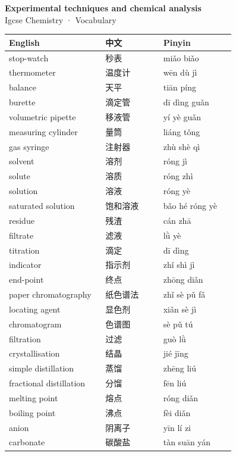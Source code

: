 \documentclass[11pt]{article}
\begin{document}
\begin{center}
  {\LARGE\bfseries Experimental techniques and chemical analysis}\\[0.35em]
  {\large Igcse Chemistry · Vocabulary}
\end{center}
\vspace{0.6em}

\begin{longtable}{@{}p{0.40\linewidth}p{0.24\linewidth}p{0.30\linewidth}@{}}
\toprule
\textbf{English} & \textbf{中文} & \textbf{Pinyin} \\
\midrule
\endhead
\bottomrule
\endlastfoot
stop-watch & 秒表 & miǎo biǎo \\
thermometer & 温度计 & wēn dù jì \\
balance & 天平 & tiān píng \\
burette & 滴定管 & dī dìng guǎn \\
volumetric pipette & 移液管 & yí yè guǎn \\
measuring cylinder & 量筒 & liáng tǒng \\
gas syringe & 注射器 & zhù shè qì \\
solvent & 溶剂 & róng jì \\
solute & 溶质 & róng zhì \\
solution & 溶液 & róng yè \\
saturated solution & 饱和溶液 & bǎo hé róng yè \\
residue & 残渣 & cán zhā \\
filtrate & 滤液 & lǜ yè \\
titration & 滴定 & dī dìng \\
indicator & 指示剂 & zhǐ shì jì \\
end-point & 终点 & zhōng diǎn \\
paper chromatography & 纸色谱法 & zhǐ sè pǔ fǎ \\
locating agent & 显色剂 & xiǎn sè jì \\
chromatogram & 色谱图 & sè pǔ tú \\
filtration & 过滤 & guò lǜ \\
crystallisation & 结晶 & jié jīng \\
simple distillation & 蒸馏 & zhēng liú \\
fractional distillation & 分馏 & fēn liú \\
melting point & 熔点 & róng diǎn \\
boiling point & 沸点 & fèi diǎn \\
anion & 阴离子 & yīn lí zi \\
carbonate & 碳酸盐 & tàn suān yán \\

\end{longtable}
\end{document}
